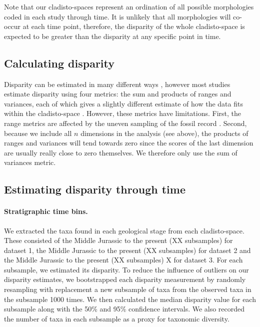 \documentclass[12pt,a4paper]{article}
\begin{document}
Note that our cladisto-spaces represent an ordination of all possible morphologies coded in each study through time.
It is unlikely that all morphologies will co-occur at each time point, therefore, the disparity of the whole cladisto-space is expected to be greater than the disparity at any specific point in time.

\subsection{Calculating disparity}
\label{disparity_calc}
Disparity can be estimated in many different ways \citep[e.g.][]{Wills1994,Ciampaglio2004,thorneresetting2011,hopkinsdecoupling2013,huang2015origins}, however most studies estimate disparity using four metrics: the sum and products of ranges and variances, each of which gives a slightly different estimate of how the data fits within the cladisto-space \citep{Foote01071994,Wills1994,brusatte50,Brusatte12092008,cisneros2010,thorneresetting2011,prentice2011,brusattedinosaur2012,toljagictriassic-jurassic2013,ruta2013,bentonmodels2014,bensonfaunal2014}.
However, these metrics have limitations. 
First, the range metrics are affected by the uneven sampling of the fossil record \citep{Butler2012}.
Second, because we include all $n$ dimensions in the analysis (see above), the products of ranges and variances will tend towards zero since the scores of the last dimension are usually really close to zero themselves. 
We therefore only use the sum of variances metric.

\subsection{Estimating disparity through time} 
\label{time_slicing}



\paragraph{Stratigraphic time bins.}
We extracted the taxa found in each geological stage from each cladisto-space.
These consisted of the Middle Jurassic to the present (XX subsamples) for dataset 1, the Middle Jurassic to the present (XX subsamples) for dataset 2 and the Middle Jurassic to the present (XX subsamples) X for dataset 3.
For each subsample, we estimated its disparity.
To reduce the influence of outliers on our disparity estimates, we bootstrapped each disparity measurement by randomly resampling with replacement a new subsample of taxa from the observed taxa in the subsample 1000 times.
We then calculated the median disparity value for each subsample along with the 50\% and 95\% confidence intervals.
We also recorded the number of taxa in each subsample as a proxy for taxonomic diversity.
\end{document}
